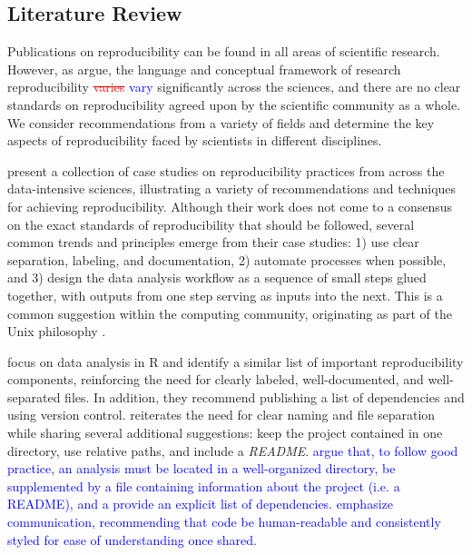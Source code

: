 \documentclass[APA,LATO1COL]{WileyNJD-v2}\usepackage[]{graphicx}\usepackage[]{color}
\newcommand{\R}{\textsf{R}\xspace}
\newcommand{\cmd}[1]{\textit{#1}}
\begin{document}
\subsection{Literature Review}\label{sec:papers}

Publications on reproducibility can be found in all areas of scientific research. However, as \citet{Goodman341ps12} argue, the language and conceptual framework of research reproducibility \textcolor{red}{\st{varies}} \textcolor{blue}{vary} significantly across the sciences, and there are no clear standards on reproducibility agreed upon by the scientific community as a whole. We consider recommendations from a variety of fields and determine the key aspects of reproducibility faced by scientists in different disciplines. 

\citet{kitzes2017practice} present a collection of case studies on reproducibility practices from across the data-intensive sciences, illustrating a variety of recommendations and techniques for achieving reproducibility. Although their work does not come to a consensus on the exact standards of reproducibility that should be followed, several common trends and principles emerge from their case studies: 1) use clear separation, labeling, and documentation, 2) automate processes when possible, and 3) design the data analysis workflow as a sequence of small steps glued together, with outputs from one step serving as inputs into the next. This is a common suggestion within the computing community, originating as part of the Unix philosophy \citep{unix}.

\citet{cooper2017guide} focus on data analysis in \R and identify a similar list of important reproducibility components, reinforcing the need for clearly labeled, well-documented, and well-separated files. In addition, they recommend publishing a list of dependencies and using version control. 
\citet{broman} reiterates the need for clear naming and file separation while sharing several additional suggestions: keep the project contained in one directory, use relative paths, and include a \cmd{README}.
\textcolor{blue}{\citet{wilson2017good} argue that, to follow good practice, an analysis must be located in a well-organized directory, be supplemented by a file containing information about the project (i.e. a README), and a provide an explicit list of dependencies.}
\textcolor{blue}{{\citet{wilson2014best}} emphasize communication, recommending that code be human-readable and consistently styled for ease of understanding once shared.}
\end{document}

